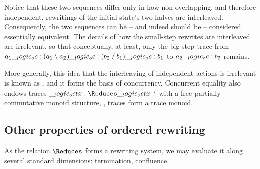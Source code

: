 Notice that these two sequences differ only in how non-overlapping, and therefore independent, rewritings of the initial state's two halves are interleaved.
Consequently, the two sequences can be -- and indeed should be -- considered essentially equivalent.
The details of how the small-step rewrites are interleaved are irrelevant, so that
conceptually, at least, only the big-step trace from $a_1 \__logic_oc: (a_1 \mathbin { \setminus } a_2) \__logic_oc: (b_2 \mathbin { / } b_1) \__logic_oc: b_1$ to $a_2 \__logic_oc: b_2$ remains.

More generally, this idea that the interleaving of independent actions is irrelevant is known as \autocite{Watkins+:CMU02}, and it forms the basis of concurrency.\autocite{??}
Concurrent equality also endows traces $\octx \Reduces \octx'$ with a free partially commutative monoid structure, \ie, traces form a trace monoid.







\subsection{Other properties of ordered rewriting}

As the relation $\Reduces$ forms a rewriting system, we may evaluate it along several standard dimensions: termination, confluence.


